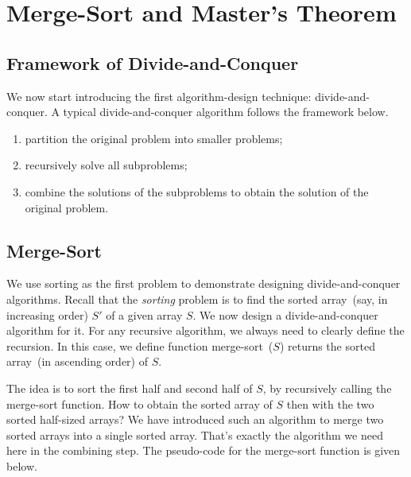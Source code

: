 \setcounter{definition}{0} \setcounter{property}{0} \setcounter{claim}{0} \setcounter{fact}{0} \setcounter{corollary}{0} \setcounter{figure}{0}
\section{Merge-Sort and Master's Theorem}

\subsection*{Framework of Divide-and-Conquer}

We now start introducing the first algorithm-design technique:
divide-and-conquer. 
A typical divide-and-conquer algorithm follows the framework below.
\vspace*{-\topsep}
\begin{enumerate}
\item partition the original problem into smaller problems;
\item recursively solve all subproblems;
\item combine the solutions of the subproblems to obtain the solution of the original problem.
\end{enumerate}

\subsection*{Merge-Sort}

We use sorting as the first problem
to demonstrate designing divide-and-conquer algorithms.
Recall that the \emph{sorting} problem is to find the sorted array~(say, in increasing order) $S'$ of a given array $S$.  
We now design a divide-and-conquer algorithm for it. For any recursive algorithm, we always need to
clearly define the recursion. In this case, we define function merge-sort~($S$) returns the
sorted array~(in ascending order) of $S$.

The idea is to sort the first half and second half of $S$, by recursively calling the merge-sort function.
How to obtain the sorted array of $S$ then with the two sorted half-sized arrays?
We have introduced such an algorithm to merge two sorted arrays into a single sorted array.
That's exactly the algorithm we need here in the combining step.
The pseudo-code for the merge-sort function is given below.

\begin{minipage}{0.8\textwidth}
	\xxx
	\xxx
	\xxx
	\xxx
	\xxx
	\xxx
\end{minipage}

